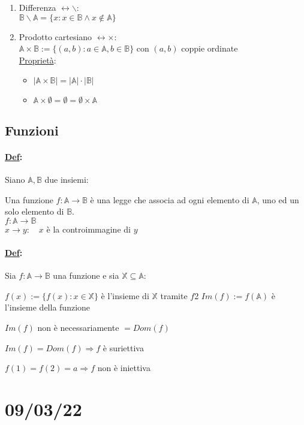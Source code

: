 \documentclass{article}
\newcommand{\ul}[1]{\underline{#1}}
\newcommand{\Def}[2]{\paragraph{\ul{Def}:}#1\\\hspace*{3em}\begin{minipage}{.8\textwidth}#2\end{minipage}}
\begin{document}
\begin{enumerate}
\begin{itemize}
	      \end{itemize}
	\item Differenza $\leftrightarrow\backslash$:\\
	      $\mathbb{B}\backslash\mathbb{A}=\{x:x\in\mathbb{B}\wedge x\not\in\mathbb{A}\}$
	\item Prodotto cartesiano $\leftrightarrow\times$:\\
	      $\mathbb{A}\times\mathbb{B}:=\{(a,b):a\in\mathbb{A},b\in\mathbb{B}\}$ con $(a,b)$ coppie ordinate\\
	      \ul{Proprietà}:
	      \begin{itemize}
		      \item $|\mathbb{A}\times\mathbb{B}|=|\mathbb{A}|\cdot|\mathbb{B}|$
		      \item $\mathbb{A}\times\emptyset=\emptyset=\emptyset\times\mathbb{A}$
	      \end{itemize}
\end{enumerate}
\subsection{Funzioni}
\Def{Siano $\mathbb{A},\mathbb{B}$ due insiemi:}
{Una funzione $f:\mathbb{A}\rightarrow\mathbb{B}$ è una legge che associa ad ogni elemento di $\mathbb{A}$, uno ed un solo elemento di $\mathbb{B}$.\\
	$f:\mathbb{A}\rightarrow\mathbb{B}$\\
	\hspace*{1.6em}$x\rightarrow y:\quad x$ è la controimmagine di $y$}
\Def{Sia $f:\mathbb{A}\rightarrow\mathbb{B}$ una funzione e sia $\mathbb{X}\subseteq\mathbb{A}$:}
{$f(x):=\{f(x):x\in\mathbb{X}\}$ è l'insieme di $\mathbb{X}$ tramite $f$2
	$Im(f):=f(\mathbb{A})$ è l'insieme della funzione

	$Im(f)$ non è necessariamente $=Dom(f)$

	$Im(f)=Dom(f)\Rightarrow f$ è suriettiva

	$f(1)=f(2)=a\Rightarrow f$ non è iniettiva}
\section{09/03/22}
\end{document}
